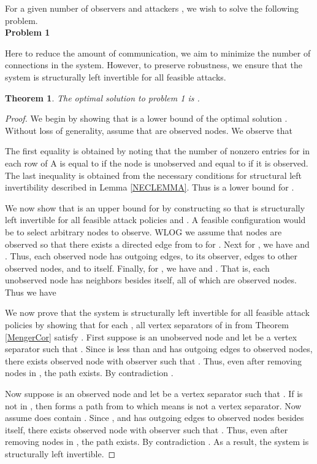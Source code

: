 \documentclass[letterpaper, 10 pt, conference]{ieeeconf}
\newtheorem{theorem}{Theorem}
\begin{document}
For a given number of observers  and attackers , we wish to solve the following problem. \\
\textbf{Problem 1}

Here to reduce the amount of communication, we aim to minimize the number of connections in the system. However, to preserve robustness, we ensure that the system is structurally left invertible for all feasible attacks.
\begin{theorem}
The optimal solution to problem 1 is . \label{optimization}
\end{theorem}
\begin{proof}
We begin by showing that  is a lower bound of the optimal solution .  Without loss of generality, assume that  are observed nodes. We observe that 

The first equality is obtained by noting that the number of nonzero entries for in each row  of A is equal to  if the node  is unobserved and equal to  if it is observed. The last inequality is obtained from the necessary conditions for structural left invertibility described in Lemma \ref{NECLEMMA}. Thus  is a lower bound for .

We now show that  is an upper bound for  by constructing   so that  is structurally left invertible for all feasible attack policies  and . A feasible configuration would be to select  arbitrary nodes to observe. WLOG we assume that nodes  are observed so that there exists a directed edge from  to  for . Next for , we have  and  . Thus, each observed node has  outgoing edges,  to its observer,  edges to other observed nodes, and  to itself. Finally, for , we have  and  . That is, each unobserved node has  neighbors besides itself, all of which are observed nodes. Thus we have


We now prove that the system is structurally left invertible for all feasible attack policies  by showing that for each , all vertex separators  of  in  from Theorem \ref{MengerCor} satisfy . First suppose  is an unobserved node and let  be a vertex separator such that . Since  is less than  and  has outgoing edges to  observed nodes, there exists observed node  with observer  such that . Thus, even after removing nodes in , the path  exists. By contradiction . 

Now suppose  is an observed node and let  be a vertex separator such that . If  is not in , then  forms a path from  to  which means  is not a vertex separator. Now assume  does contain . Since , and  has outgoing edges to  observed nodes besides itself, there exists observed node  with observer  such that . Thus, even after removing nodes in , the path  exists. By contradiction . As a result, the system is structurally left invertible.
\end{proof}
\end{document}
